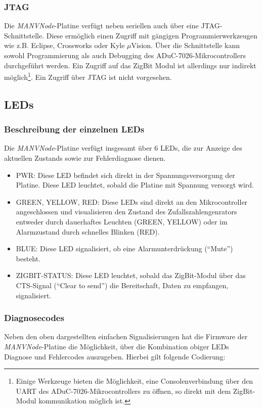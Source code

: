 \subsubsection{JTAG}
Die \emph{MANVNode}-Platine verfügt neben seriellen auch über eine JTAG-Schnittstelle. Diese ermöglich einen Zugriff mit
gängigen Programmierwerkzeugen wie z.B. Eclipse, Crossworks oder Kyle $\mu{}$Vision. Über die Schnittstelle kann sowohl 
Programmierung als auch Debugging des ADuC-7026-Mikrocontrollers durchgeführt werden. Ein Zugriff auf das ZigBit
Modul ist allerdings nur indirekt möglich\footnote{Einige Werkzeuge bieten die Möglichkeit, eine Consolenverbindung
über den UART des ADuC-7026-Mikrocontrollers zu öffnen, so direkt mit dem ZigBit-Modul kommunikation möglich ist.}.
Ein Zugriff über JTAG ist nicht vorgesehen.

\subsection{LEDs}

\subsubsection{Beschreibung der einzelnen LEDs}
Die \emph{MANVNode}-Platine verfügt insgesamt über 6 LEDs, die zur Anzeige des aktuellen Zustands sowie zur Fehlerdiagnose dienen.
\begin{itemize}
    \item{PWR:} Diese LED befindet sich direkt in der Spannungsversorgung der Platine. Diese LED leuchtet, sobald
                die Platine mit Spannung versorgt wird. 
    \item{GREEN, YELLOW, RED}: Diese LEDs sind direkt an den Mikrocontroller angeschlossen und visualisieren den Zustand des
                               Zufallszahlengenrators entweder durch dauerhaftes Leuchten (GREEN, YELLOW) oder im Alarmzustand
                               durch schnelles Blinken (RED). 
    \item{BLUE}: Diese LED signalisiert, ob eine Alarmunterdrückung ("`Mute"') besteht.
    \item{ZIGBIT-STATUS}: Diese LED leuchtet, sobald das ZigBit-Modul über das CTS-Signal ("`Clear to send"') die Bereitschaft, 
                          Daten zu empfangen, signalisiert.
\end{itemize}
                 
    

\subsubsection{Diagnosecodes}
Neben den oben dargestellten einfachen Signalisierungen hat die Firmware der \emph{MANVNode}-Platine die Möglichkeit, über die
Kombination obiger LEDs Diagnose und Fehlercodes auszugeben. Hierbei gilt folgende Codierung:

